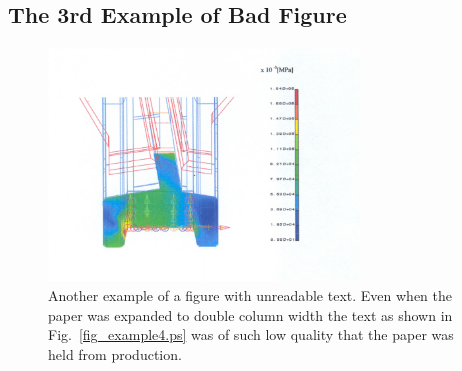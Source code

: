\documentclass[twocolumn,10pt,journal]{asme2e}
\begin{document}
\subsection{The 3rd Example of Bad Figure}
\begin{figure}
 \centerline{\includegraphics[width=3.25in]{figure/FMANU_MD_04_1274_13}}
 \caption{Another example of a figure with unreadable text.
  Even when the paper was expanded to double column width the text as shown in Fig.~\ref{fig_example4.ps} was of such low quality that the paper was held from production.}
 \label{fig_example3.ps}
\end{figure}
\end{document}
